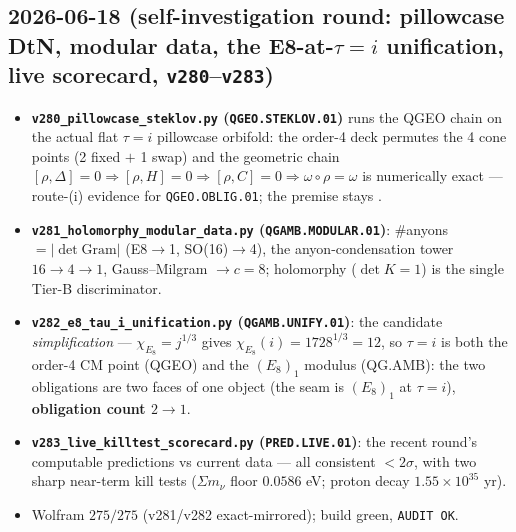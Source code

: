 \subsection*{2026-06-18 (self-investigation round: pillowcase DtN, modular data, the E8-at-$\tau{=}i$ unification, live scorecard, \texttt{v280}--\texttt{v283})}
\begin{itemize}
\item \textbf{\texttt{v280\_pillowcase\_steklov.py} (\texttt{QGEO.STEKLOV.01})} runs the QGEO chain on the actual
  flat $\tau{=}i$ pillowcase orbifold: the order-4 deck permutes the 4 cone points (2 fixed $+$ 1 swap) and the
  geometric chain $[\rho,\Delta]{=}0\Rightarrow[\rho,H]{=}0\Rightarrow[\rho,C]{=}0\Rightarrow\omega\circ\rho{=}\omega$
  is numerically exact --- route-(i) evidence for \texttt{QGEO.OBLIG.01}; the premise stays \mO.
\item \textbf{\texttt{v281\_holomorphy\_modular\_data.py} (\texttt{QGAMB.MODULAR.01})}: \#anyons $=|\det\mathrm{Gram}|$
  (E8$\to$1, SO(16)$\to$4), the anyon-condensation tower $16\to4\to1$, Gauss--Milgram $\to c{=}8$; holomorphy
  ($\det K{=}1$) is the single Tier-B discriminator.
\item \textbf{\texttt{v282\_e8\_tau\_i\_unification.py} (\texttt{QGAMB.UNIFY.01})}: the candidate
  \emph{simplification} --- $\chi_{E_8}{=}j^{1/3}$ gives $\chi_{E_8}(i){=}1728^{1/3}{=}12$, so $\tau{=}i$ is both
  the order-4 CM point (QGEO) and the $(E_8)_1$ modulus (QG.AMB): the two obligations are two faces of one object
  (the seam is $(E_8)_1$ at $\tau{=}i$), \textbf{obligation count $2\to1$}.
\item \textbf{\texttt{v283\_live\_killtest\_scorecard.py} (\texttt{PRED.LIVE.01})}: the recent round's
  computable predictions vs current data --- all consistent $<2\sigma$, with two sharp near-term kill tests
  ($\Sigma m_\nu$ floor $0.0586$ eV; proton decay $1.55{\times}10^{35}$ yr).
\item Wolfram $275/275$ (v281/v282 exact-mirrored); build green, \texttt{AUDIT OK}.
\end{itemize}

